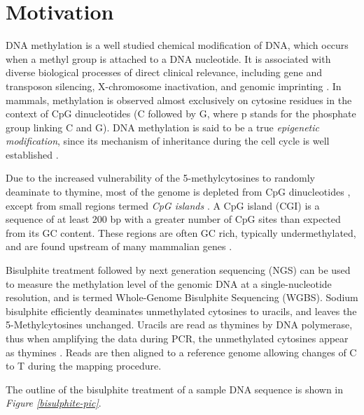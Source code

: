 \section{Motivation} \label{motivation-l}
DNA methylation is a well studied chemical modification of DNA, which occurs when a methyl group is attached to a DNA nucleotide. It is associated with diverse biological processes of direct clinical relevance, including gene and transposon silencing, X-chromosome inactivation, and  genomic imprinting \citep{Li1993, Mohandas1981}. In mammals,  methylation is observed almost exclusively on cytosine residues in the context of CpG dinucleotides (\ie C followed by G, where p stands for the phosphate group linking C and G). DNA methylation is said to be a true \emph{epigenetic modification}, since its mechanism of inheritance during the cell cycle is well established \citep{Law2010}. 

Due to the increased vulnerability of the 5-methylcytosines to randomly deaminate to thymine, most of the genome is depleted from CpG dinucleotides \citep{Scarano1967}, except from small regions termed \emph{CpG islands} \citep{Bird2002}. A CpG island (CGI) is a sequence of at least 200 bp with a greater number of CpG sites than expected from its GC content. These regions are often GC rich, typically undermethylated, and are found upstream of many mammalian genes \citep{Law2010}. 

Bisulphite treatment \citep{Frommer1992} followed by next generation sequencing (NGS) can be used to measure the methylation level of the genomic DNA at a single-nucleotide resolution, and is termed Whole-Genome Bisulphite Sequencing (WGBS). Sodium bisulphite efficiently deaminates unmethylated cytosines to uracils, and leaves the 5-Methylcytosines unchanged. Uracils are read as thymines by DNA polymerase, thus when amplifying the data during PCR, the unmethylated cytosines appear as thymines \citep{Krueger2012}. Reads are then aligned to a reference genome allowing changes of C to T during the mapping procedure. 

The outline of the bisulphite treatment of a sample DNA sequence is shown in \emph{Figure \ref{bisulphite-pic}}.

